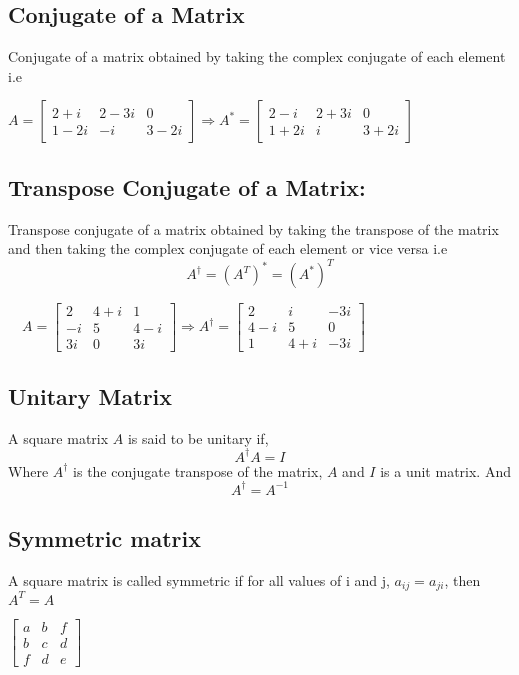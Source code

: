 \subsection{Conjugate of a Matrix}
Conjugate of a matrix obtained by taking the complex conjugate of each element  i.e
\begin{example}
	$
	A=\left[\begin{array}{ccc}
		2+i & 2-3 i & 0 \\
		1-2 i & -i & 3-2 i
	\end{array}\right]
	 \Rightarrow{A^{\ast}}=\left[\begin{array}{ccc}
		2-i & 2+3 i & 0 \\
		1+2 i & i & 3+2 i
	\end{array}\right]
	$
\end{example}

\subsection{Transpose Conjugate of a Matrix:}
Transpose conjugate of a matrix obtained by taking the transpose of the matrix and then taking the complex conjugate of each element or vice versa i.e
$$
A^{\dagger}=\left(A^{T}\right)^{*}=\left(A^{*}\right)^{T}
$$
\begin{example}
	$
	 \quad A=\left[\begin{array}{ccc}
		2 & 4+i & 1 \\
		-i & 5 & 4-i \\
		3i & 0 & 3i
	\end{array}\right] \Rightarrow A^{\dagger}=\left[\begin{array}{ccc}
		2 & i & -3i \\
		4-i & 5 & 0 \\
		1 & 4+ i & -3i
	\end{array}\right]
	$
\end{example}
\subsection{Unitary Matrix}
 A square matrix $A$ is said to be unitary if,
 \begin{equation*}
 A^{\dagger}A=I
 \end{equation*}
Where $A^{\dagger}$ is the conjugate transpose of the matrix, $ A$ and $I$ is a unit matrix. And 
 \begin{equation*}
 A^{\dagger}=A^{-1}
 \end{equation*} 
\subsection{Symmetric matrix}
A square matrix is called symmetric if for all values of i and j, $a_{i j}=a_{j i}$, then $A^{T}=A$ 
\begin{example} $\left[\begin{array}{lll}a & b & f \\ b & c & d \\ f & d & e\end{array}\right]$	 
	\end{example}

